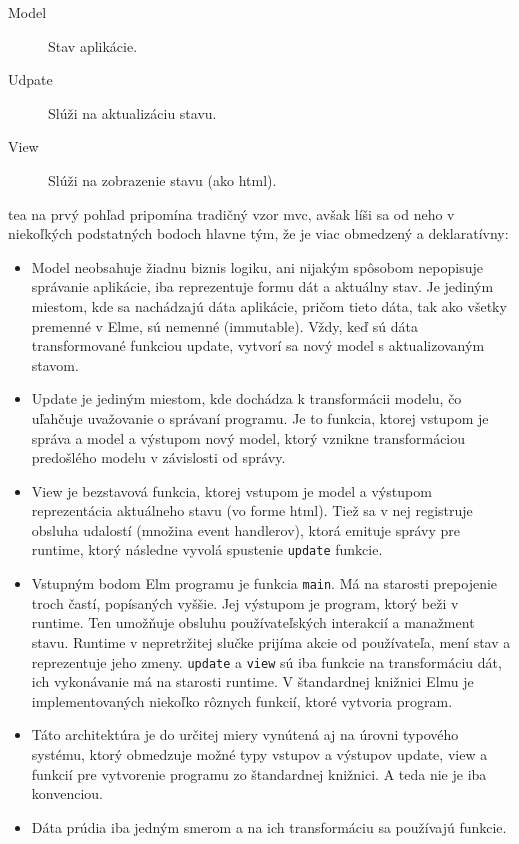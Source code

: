 \begin{description}
\item[Model] Stav aplikácie.
\item[Udpate] Slúži na aktualizáciu stavu.
\item[View] Slúži na zobrazenie stavu (ako \acrshort{html}).
\end{description}

\acrshort{tea} na prvý pohľad pripomína tradičný vzor \acrfull{mvc}, avšak líši
sa od neho v niekoľkých podstatných bodoch hlavne tým, že je viac obmedzený a
deklaratívny:

\begin{itemize}
\item Model neobsahuje žiadnu biznis logiku, ani nijakým spôsobom nepopisuje
  správanie aplikácie, iba reprezentuje formu dát a aktuálny stav. Je jediným
  miestom, kde sa nachádzajú dáta aplikácie, pričom tieto dáta, tak ako všetky
  premenné v Elme, sú nemenné (immutable). Vždy, keď sú dáta transformované
  funkciou update, vytvorí sa nový model s aktualizovaným stavom.
\item Update je jediným miestom, kde dochádza k transformácii modelu, čo
  uľahčuje uvažovanie o správaní programu. Je to funkcia, ktorej vstupom je
  správa a model a výstupom nový model, ktorý vznikne transformáciou predošlého
  modelu v závislosti od správy.
\item View je bezstavová funkcia, ktorej vstupom je model a výstupom
  reprezentácia aktuálneho stavu (vo forme \acrshort{html}). Tiež sa v nej
  registruje obsluha udalostí (množina event handlerov), ktorá emituje správy
  pre runtime, ktorý následne vyvolá spustenie \texttt{update} funkcie.
\item Vstupným bodom Elm programu je funkcia \texttt{main}. Má na starosti
  prepojenie troch častí, popísaných vyššie. Jej výstupom je program, ktorý beži
  v runtime. Ten umožňuje obsluhu používateľských interakcií a manažment stavu.
  Runtime v nepretržitej slučke prijíma akcie od používateľa, mení stav a
  reprezentuje jeho zmeny. \texttt{update} a \texttt{view} sú iba funkcie na
  transformáciu dát, ich vykonávanie má na starosti runtime. \cite{tea} V
  štandardnej knižnici Elmu je implementovaných niekoľko rôznych funkcií, ktoré
  vytvoria program.
\item Táto architektúra je do určitej miery vynútená aj na úrovni typového
  systému, ktorý obmedzuje možné typy vstupov a výstupov update, view a funkcií
  pre vytvorenie programu zo štandardnej knižnici. A teda nie je iba konvenciou.
\item Dáta prúdia iba jedným smerom a na ich transformáciu sa používajú funkcie.
\end{itemize}

